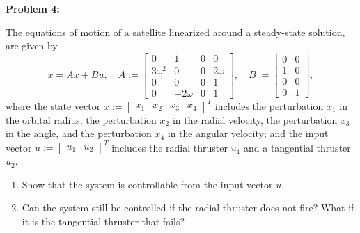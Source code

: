 \documentclass[12pt]{article}
\newenvironment{problem}[1]{
    \textbf{Problem #1:}
}{
    \rmfamily \vspace{1em}
}
\begin{document}
\newpage

\begin{problem}{4}
The equations of motion of a satellite linearized around a steady-state solution, are given by
\[
    \dot{x} = Ax + Bu, \quad A := \begin{bmatrix}
        0 & 1 & 0 & 0\\
        3\omega^2 & 0 & 0 & 2\omega\\
        0 & 0 & 0 & 1\\
        0 & -2\omega & 0 & 1
    \end{bmatrix}, \quad B := \begin{bmatrix}
        0 & 0\\
        1 & 0\\
        0 & 0\\
        0 & 1
    \end{bmatrix},
\]
where the state vector \(x := \begin{bmatrix} x_1 & x_2 & x_3 & x_4 \end{bmatrix}^T\) includes the perturbation \(x_1\) in the orbital radius, the perturbation \(x_2\) in the radial velocity, the perturbation \(x_3\) in the angle, and the perturbation \(x_4\) in the angular velocity; and the input vector \(u := \begin{bmatrix} u_1 & u_2 \end{bmatrix}^T\) includes the radial thruster \(u_1\) and a tangential thruster \(u_2\).

\begin{enumerate}[label=(\alph*)]
    \item Show that the system is controllable from the input vector \(u\).
    \item Can the system still be controlled if the radial thruster does not fire? What if it is the tangential thruster that fails?
\end{enumerate}
\end{problem}
\end{document}
